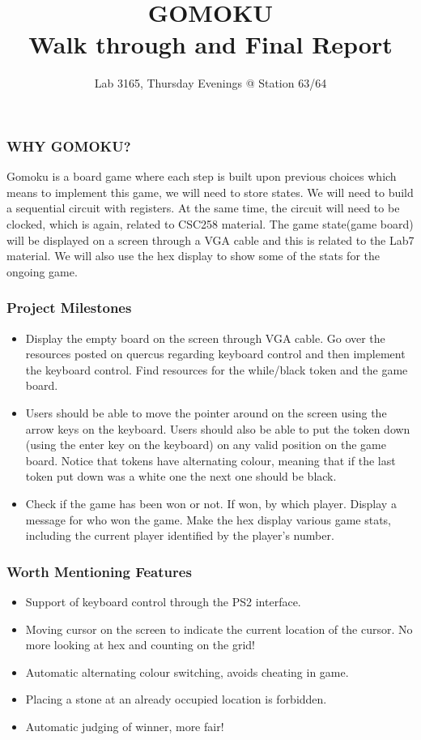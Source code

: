 \documentclass{beamer}
\title{\LARGE{GOMOKU} \\ \small{Walk through and Final Report}}
\author{Lab 3165, Thursday Evenings @ Station 63/64}
\institute{University of Toronto}
\begin{document}
\maketitle

\newpage

\begin{frame}
    \frametitle{WHY GOMOKU?}
    Gomoku is a board game where each step is built upon previous choices which means to implement this game, we will need to store states. We will need to build a sequential circuit with registers. At the same time, the circuit will need to be clocked, which is again, related to CSC258 material. The game state(game board) will be displayed on a screen through a VGA cable and this is related to the Lab7 material. We will also use the hex display to show some of the stats for the ongoing game. 
\end{frame}




\begin{frame}
\frametitle{Project Milestones}

\begin{itemize}
    \item Display the empty board on the screen through VGA cable. Go over the resources posted on quercus regarding keyboard control and then implement the keyboard control. Find resources for the while/black token and the game board.\newline
    \item Users should be able to move the pointer around on the screen using the arrow keys on the keyboard. Users should also be able to put the token down (using the enter key on the keyboard) on any valid position on the game board. Notice that tokens have alternating colour, meaning that if the last token put down was a white one the next one should be black. \newline
    \item Check if the game has been won or not. If won, by which player. Display a message for who won the game. Make the hex display various game stats, including the current player identified by the player’s number.
\end{itemize}
\end{frame}

\begin{frame}
    \frametitle{Worth Mentioning Features}
    \begin{itemize}
        \item Support of keyboard control through the PS2 interface.
        \item Moving cursor on the screen to indicate the current location of the cursor. No more looking at hex and counting on the grid!
        \item Automatic alternating colour switching, avoids cheating in game.
        \item Placing a stone at an already occupied location is forbidden.
        \item Automatic judging of winner, more fair!
    \end{itemize}
\end{frame}
\end{document}
